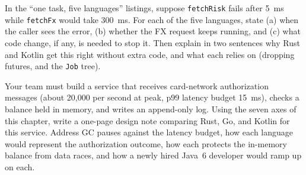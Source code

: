 \begin{exercise}
\label{ex:ch11-cancellation}
In the ``one task, five languages'' listings, suppose \texttt{fetchRisk} fails after 5~ms while \texttt{fetchFx} would take 300~ms. For each of the five languages, state (a) when the caller sees the error, (b) whether the FX request keeps running, and (c) what code change, if any, is needed to stop it. Then explain in two sentences why Rust and Kotlin get this right without extra code, and what each relies on (dropping futures, and the \texttt{Job} tree).
\end{exercise}

\begin{exercise}
\label{ex:ch11-architecture}
Your team must build a service that receives card-network authorization messages (about 20,000 per second at peak, p99 latency budget 15~ms), checks a balance held in memory, and writes an append-only log. Using the seven axes of this chapter, write a one-page design note comparing Rust, Go, and Kotlin for this service. Address GC pauses against the latency budget, how each language would represent the authorization outcome, how each protects the in-memory balance from data races, and how a newly hired Java~6 developer would ramp up on each.
\end{exercise}
